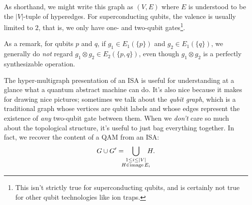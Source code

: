 As shorthand, we might write this graph as $(V,E)$ where $E$ is understood to be the $\vert V\vert$-tuple of hyperedges. For superconducting qubits, the valence is usually limited to $2$, that is, we only have one- and two-qubit gates\footnote{This isn't strictly true for superconducting qubits, and is certainly not true for other qubit technologies like ion traps.}.

As a remark, for qubits $p$ and $q$, if $g_1\in E_1(\{p\})$ and $g_2\in E_1(\{q\})$, we generally do \emph{not} regard $g_1\otimes g_2\in E_2(\{p,q\})$, even though $g_1\otimes g_2$ is a perfectly synthesizable operation.

The hyper-multigraph presentation of an ISA is useful for understanding at a glance what a quantum abstract machine can do. It's also nice because it makes for drawing nice pictures; sometimes we talk about the \emph{qubit graph}, which is a traditional graph whose vertices are qubit labels and whose edges represent the existence of \emph{any} two-qubit gate between them. When we \emph{don't} care so much about the topological structure, it's useful to just bag everything together. In fact, we recover the content of a QAM from an ISA:
\begin{equation}
    G \cup G' = \bigcup_{\substack{1\leq i\leq\vert V\vert\\\mathclap{H\in \image E_i}}}H.
\end{equation}

